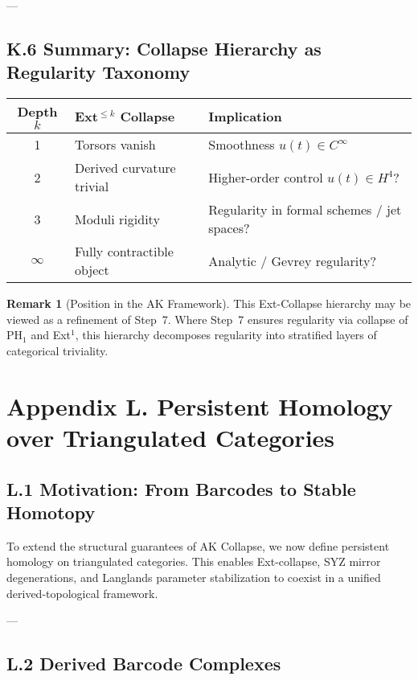 \documentclass[11pt]{article}
\theoremstyle{definition}
\newtheorem{remark}[theorem]{Remark}
\begin{document}
---

\subsection*{K.6 Summary: Collapse Hierarchy as Regularity Taxonomy}

\begin{center}
\renewcommand{\arraystretch}{1.3}
\begin{tabular}{|c|l|l|}
\hline
\textbf{Depth \( k \)} & \textbf{Ext$^{\leq k}$ Collapse} & \textbf{Implication} \\
\hline
1 & Torsors vanish & Smoothness $u(t) \in C^\infty$ \\
2 & Derived curvature trivial & Higher-order control $u(t) \in H^4$? \\
3 & Moduli rigidity & Regularity in formal schemes / jet spaces? \\
$\infty$ & Fully contractible object & Analytic / Gevrey regularity? \\
\hline
\end{tabular}
\end{center}

\begin{remark}[Position in the AK Framework]
This Ext-Collapse hierarchy may be viewed as a refinement of Step~7.  
Where Step~7 ensures regularity via collapse of $\mathrm{PH}_1$ and Ext$^1$,  
this hierarchy decomposes regularity into stratified layers of categorical triviality.
\end{remark}


\section*{Appendix L. Persistent Homology over Triangulated Categories}

\subsection*{L.1 Motivation: From Barcodes to Stable Homotopy}

To extend the structural guarantees of AK Collapse, we now define persistent homology on triangulated categories.  
This enables Ext-collapse, SYZ mirror degenerations, and Langlands parameter stabilization to coexist in a unified derived-topological framework.

---

\subsection*{L.2 Derived Barcode Complexes}
\end{document}
